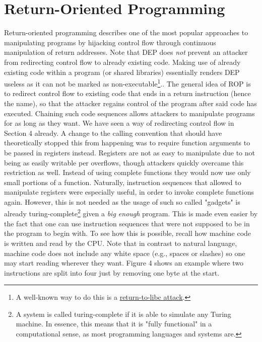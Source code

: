 \documentclass[10pt,twocolumn,a4paper]{article}
\begin{document}
\section{Return-Oriented Programming}\label{ROP}
Return-oriented programming describes one of the most popular approaches to manipulating programs by hijacking control flow through continuous manipulation of return addresses.
Note that DEP does \emph{not} prevent an attacker from redirecting control flow to already existing code.
Making use of already existing code within a program (or shared libraries) essentially renders DEP useless as it can not be marked as non-executable\cite{solar}\footnote{A well-known way to do this is a \hyperref{https://en.wikipedia.org/wiki/Return-to-libc_attack}{Return-to-Libc Exploits}{name}{return-to-libc attack}.}..
The general idea of ROP is to redirect control flow to existing code that ends in a return instruction (hence the name), so that the attacker regains control of the program after said code has executed. Chaining such code sequences allows attackers to manipulate programs for as long as they want.
We have seen a way of redirecting control flow in Section 4 already.
A change to the calling convention that should have theoretically stopped this from happening was to require function arguments to be passed in registers instead\cite{calling}. Registers are not as easy to manipulate due to not being as easily writable per overflows, though attackers quickly overcame this restriction as well.
Instead of using complete functions they would now use only small portions of a function\cite{krahmer}. Naturally, instruction sequences that allowed to manipulate registers were especially useful, in order to invoke complete functions again.
However, this is not needed as the usage of such so called "gadgets" is already turing-complete\footnote{A system is called turing-complete if it is able to simulate any Turing machine. In essence, this means that it is "fully functional" in a computational sense, as most programming languages and systems are\cite{Turing}.} given a \emph{big enough}\cite{gadgets} program.
This is made even easier by the fact that one can use instruction sequences that were not supposed to be in the program to begin with.
To see how this is possible, recall how machine code is written and read by the CPU.
Note that in contrast to natural language, machine code does not include any white space (e.g., spaces or slashes) so one may start reading wherever they want\cite{gadgets}.
Figure 4 shows an example where two instructions are split into four just by removing one byte at the start.
\end{document}

